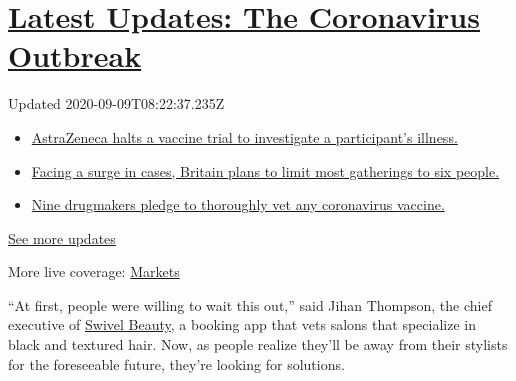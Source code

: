 \hypertarget{latest-updates-the-coronavirus-outbreak}{%
\section{\texorpdfstring{\href{https://www.nytimes3xbfgragh.onion/2020/09/08/world/covid-19-coronavirus.html?action=click\&pgtype=Article\&state=default\&region=MAIN_CONTENT_1\&context=storylines_live_updates}{Latest
Updates: The Coronavirus
Outbreak}}{Latest Updates: The Coronavirus Outbreak}}\label{latest-updates-the-coronavirus-outbreak}}

Updated 2020-09-09T08:22:37.235Z

\begin{itemize}
\tightlist
\item
  \href{https://www.nytimes3xbfgragh.onion/2020/09/08/world/covid-19-coronavirus.html?action=click\&pgtype=Article\&state=default\&region=MAIN_CONTENT_1\&context=storylines_live_updates\#link-313b443d}{AstraZeneca
  halts a vaccine trial to investigate a participant's illness.}
\item
  \href{https://www.nytimes3xbfgragh.onion/2020/09/08/world/covid-19-coronavirus.html?action=click\&pgtype=Article\&state=default\&region=MAIN_CONTENT_1\&context=storylines_live_updates\#link-4438dd7}{Facing
  a surge in cases, Britain plans to limit most gatherings to six
  people.}
\item
  \href{https://www.nytimes3xbfgragh.onion/2020/09/08/world/covid-19-coronavirus.html?action=click\&pgtype=Article\&state=default\&region=MAIN_CONTENT_1\&context=storylines_live_updates\#link-679303d7}{Nine
  drugmakers pledge to thoroughly vet any coronavirus vaccine.}
\end{itemize}

\href{https://www.nytimes3xbfgragh.onion/2020/09/08/world/covid-19-coronavirus.html?action=click\&pgtype=Article\&state=default\&region=MAIN_CONTENT_1\&context=storylines_live_updates}{See
more updates}

More live coverage:
\href{https://www.nytimes3xbfgragh.onion/live/2020/09/08/business/stock-market-today-coronavirus?action=click\&pgtype=Article\&state=default\&region=MAIN_CONTENT_1\&context=storylines_live_updates}{Markets}

``At first, people were willing to wait this out,'' said Jihan Thompson,
the chief executive of \href{https://www.swivelbeauty.com/}{Swivel
Beauty}, a booking app that vets salons that specialize in black and
textured hair. Now, as people realize they'll be away from their
stylists for the foreseeable future, they're looking for solutions.

